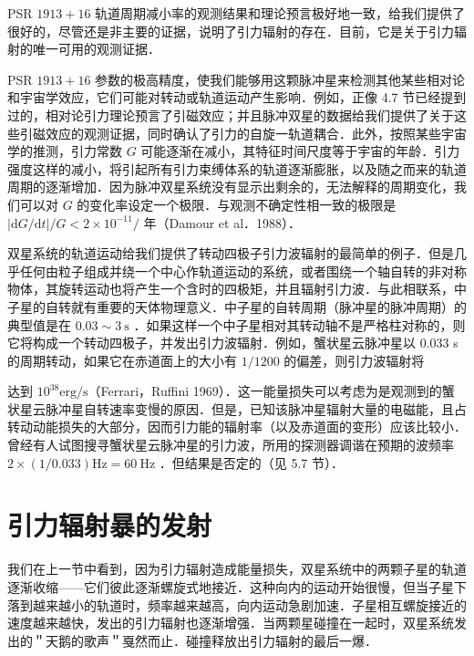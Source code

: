 PSR $1913+16$ 轨道周期减小率的观测结果和理论预言极好地一致，给我们提供了很好的，尽管还是非主要的证据，说明了引力辐射的存在．目前，它是关于引力辐射的唯一可用的观测证据．

PSR $1913+16$ 参数的极高精度，使我们能够用这颗脉冲星来检测其他某些相对论和宇宙学效应，它们可能对转动或轨道运动产生影响．例如，正像 4.7 节已经提到过的，相对论引力理论预言了引磁效应；并且脉冲双星的数据给我们提供了关于这些引磁效应的观测证据，同时确认了引力的自旋一轨道耦合．此外，按照某些宇宙学的推测，引力常数 $G$ 可能逐渐在减小，其特征时间尺度等于宇宙的年龄．引力强度这样的减小，将引起所有引力束缚体系的轨道逐渐膨胀，以及随之而来的轨道周期的逐渐增加．因为脉冲双星系统没有显示出剩余的，无法解释的周期变化，我们可以对 $G$ 的变化率设定一个极限．与观测不确定性相一致的极限是 $|\mathrm{d} G / \mathrm{d} t| / G<2 \times 10^{-11} /$ 年（Damour et al．1988）．

双星系统的轨道运动给我们提供了转动四极子引力波辐射的最简单的例子．但是几乎任何由粒子组成并绕一个中心作轨道运动的系统，或者围绕一个轴自转的非对称物体，其旋转运动也将产生一个含时的四极矩，并且辐射引力波．与此相联系，中子星的自转就有重要的天体物理意义．中子星的自转周期（脉冲星的脉冲周期）的典型值是在 $0.03 \sim 3 \mathrm{~s}$ ．如果这样一个中子星相对其转动轴不是严格柱对称的，则它将构成一个转动四极子，并发出引力波辐射．例如，蟹状星云脉冲星以 0.033 s 的周期转动，如果它在赤道面上的大小有 $1 / 1200$ 的偏差，则引力波辐射将

达到 $10^{38} \mathrm{erg} / \mathrm{s}$（Ferrari，Ruffini 1969）．这一能量损失可以考虑为是观测到的蟹状星云脉冲星自转速率变慢的原因．但是，已知该脉冲星辐射大量的电磁能，且占转动动能损失的大部分，因而引力能的辐射率（以及赤道面的变形）应该比较小．曾经有人试图搜寻蟹状星云脉冲星的引力波，所用的探测器调谐在预期的波频率 $2 \times(1 / 0.033) \mathrm{Hz}=60 \mathrm{~Hz}$ ．但结果是否定的（见 5.7 节）．

\section{引力辐射暴的发射}
我们在上一节中看到，因为引力辐射造成能量损失，双星系统中的两颗子星的轨道逐渐收缩——它们彼此逐渐螺旋式地接近．这种向内的运动开始很慢，但当子星下落到越来越小的轨道时，频率越来越高，向内运动急剧加速．子星相互螺旋接近的速度越来越快，发出的引力辐射也逐渐增强．当两颗星碰撞在一起时，双星系统发出的＂天鹅的歌声＂戛然而止．碰撞释放出引力辐射的最后一爆．

